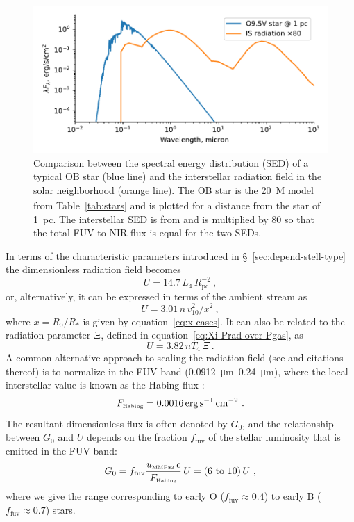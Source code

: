 \begin{figure}
  \centering
  \includegraphics[width=\linewidth]{figs/sed-comparison}
  \caption{Comparison between the spectral energy distribution (SED)
    of a typical OB star (blue line) and the interstellar radiation
    field in the solar neighborhood (orange line).  The OB star is the
    \SI{20}{M_\odot} model from Table~\ref{tab:stars} and is plotted for a
    distance from the star of \SI{1}{pc}.  The interstellar SED is
    from \citet{Mathis:1983a} and is multiplied by \num{80} so that
    the total FUV-to-NIR flux is equal for the two SEDs.}
  \label{fig:sed-comparison}
\end{figure}

In terms of the characteristic parameters introduced in
\S~\ref{sec:depend-stell-type} the dimensionless radiation field becomes
\begin{equation}
  \label{eq:U-from-L4-and-Rpc}
  U = 14.7\, L_4\, R_{\text{pc}}^{-2} \ ,
\end{equation}
or, alternatively, it can be expressed in terms of the ambient stream as
\begin{equation}
  \label{eq:U-from-ambient}
  U = 3.01 \, n \, v_{10}^2 / x^2 \ , 
\end{equation}
where \(x = R_0/R_*\) is given by equation~\eqref{eq:x-cases}.  It can
also be related to the radiation parameter \(\Xi\), defined in
equation~\eqref{eq:Xi-Prad-over-Pgas}, as
\begin{equation}
  \label{eq:U-vs-Xi}
  U = 3.82 \, n T_4 \, \Xi \ .
\end{equation}
A common alternative approach to scaling the radiation field (see
\citealp{Tielens:1985a} and citations thereof) is to normalize in the
FUV band (\SIrange{0.0912}{0.24}{\um}), where the local interstellar
value is known as the Habing flux \citep{Habing:1968a}:
\begin{equation}
  \label{eq:Habing-flux}
  F_{\text{\tiny Habing}} = \SI{0.0016}{erg.s^{-1}.cm^{-2}} \ .
\end{equation}
The resultant dimensionless flux is often denoted by \(G_0\), and the
relationship between \(G_0\) and \(U\) depends on the fraction
\(f_{\text{fuv}}\) of the stellar luminosity that is emitted in the
FUV band:
\begin{equation}
  \label{eq:G-vs-U}
  G_0 = f_{\text{fuv}} \frac{u\mmp\, c}{F\Hab} \,U = (\text{\numrange{6}{10}}) \,U \ ,
\end{equation}
where we give the range corresponding to early O (\(f_{\text{fuv}} \approx 0.4\)) to early B (\(f_{\text{fuv}} \approx 0.7\)) stars.

